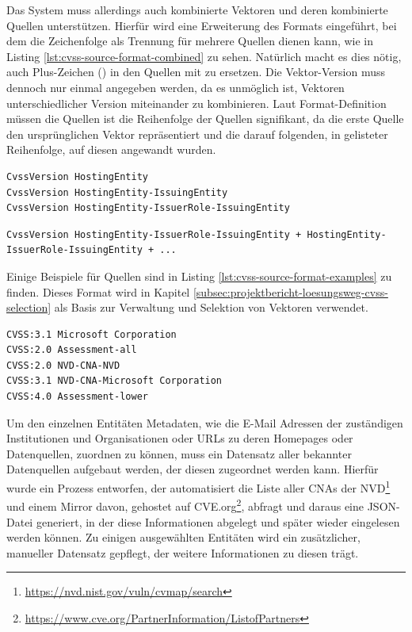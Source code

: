 Das System muss allerdings auch kombinierte Vektoren und deren kombinierte Quellen unterstützen.
Hierfür wird eine Erweiterung des Formats eingeführt, bei dem die Zeichenfolge \qt{ + } als Trennung für mehrere Quellen dienen kann, wie in Listing \ref{lst:cvss-source-format-combined} zu sehen.
Natürlich macht es dies nötig, auch Plus-Zeichen (\qt{+}) in den Quellen mit \qt{\\+} zu ersetzen.
Die Vektor-Version muss dennoch nur einmal angegeben werden, da es unmöglich ist, Vektoren unterschiedlicher Version miteinander zu kombinieren.
Laut Format-Definition müssen die Quellen ist die Reihenfolge der Quellen signifikant, da die erste Quelle den ursprünglichen Vektor repräsentiert und die darauf folgenden, in gelisteter Reihenfolge, auf diesen angewandt wurden.

\begin{lstlisting}[language={}, label={lst:cvss-source-format}, caption={CVSS-Quellen Format}]
CvssVersion HostingEntity
CvssVersion HostingEntity-IssuingEntity
CvssVersion HostingEntity-IssuerRole-IssuingEntity
\end{lstlisting}

\begin{lstlisting}[language={}, label={lst:cvss-source-format-combined}, caption={CVSS-Quellen Format \(Kombiniert\)}]
CvssVersion HostingEntity-IssuerRole-IssuingEntity + HostingEntity-IssuerRole-IssuingEntity + ...
\end{lstlisting}

Einige Beispiele für Quellen sind in Listing \ref{lst:cvss-source-format-examples} zu finden.
Dieses Format wird in Kapitel \ref{subsec:projektbericht-loesungsweg-cvss-selection} als Basis zur Verwaltung und Selektion von Vektoren verwendet.

\begin{lstlisting}[language={}, label={lst:cvss-source-format-examples}, caption={CVSS Sources Format}]
CVSS:3.1 Microsoft Corporation
CVSS:2.0 Assessment-all
CVSS:2.0 NVD-CNA-NVD
CVSS:3.1 NVD-CNA-Microsoft Corporation
CVSS:4.0 Assessment-lower
\end{lstlisting}

Um den einzelnen Entitäten Metadaten, wie die E-Mail Adressen der zuständigen Institutionen und Organisationen oder URLs zu deren Homepages oder Datenquellen, zuordnen zu können, muss ein Datensatz aller bekannter Datenquellen aufgebaut werden, der diesen zugeordnet werden kann.
Hierfür wurde ein Prozess entworfen, der automatisiert die Liste aller CNAs der NVD\footnote{\url{https://nvd.nist.gov/vuln/cvmap/search}} und einem Mirror davon, gehostet auf CVE.org\footnote{\url{https://www.cve.org/PartnerInformation/ListofPartners}}, abfragt und daraus eine JSON-Datei generiert, in der diese Informationen abgelegt und später wieder eingelesen werden können.
Zu einigen ausgewählten Entitäten wird ein zusätzlicher, manueller Datensatz gepflegt, der weitere Informationen zu diesen trägt.

